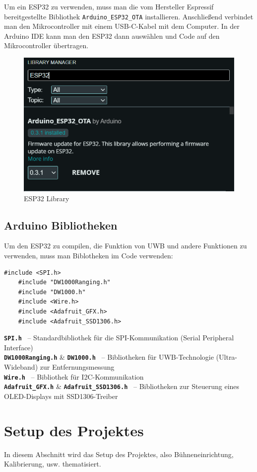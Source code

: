 Um ein ESP32 zu verwenden, muss man die vom Hersteller Espressif bereitgestellte Bibliothek \texttt{Arduino\_ESP32\_OTA} installieren. Anschließend verbindet man den Mikrocontroller mit einem USB-C-Kabel mit dem Computer. In der Arduino IDE kann man den ESP32 dann auswählen und Code auf den Mikrocontroller übertragen.

\begin{figure}[H]
	\centering
	\includegraphics[width=0.5\linewidth]{images/ArduinoLib.png}
	\caption[ESP32Library]{ESP32 Library}
	\label{fig:ESP32Lib}
\end{figure}

\subsection{Arduino Bibliotheken}
Um den ESP32 zu compilen, die Funktion von UWB und andere Funktionen zu verwenden, muss man Biblotheken im Code verwenden: 
\begin{lstlisting}[style=C++, caption=Biblotheken, captionpos=b]
	#include <SPI.h>
	#include "DW1000Ranging.h"
	#include "DW1000.h"
	#include <Wire.h>
	#include <Adafruit_GFX.h>
	#include <Adafruit_SSD1306.h>
\end{lstlisting}

\textbf{\texttt{SPI.h}} \ – Standardbibliothek für die SPI-Kommunikation (Serial Peripheral Interface) \\
\textbf{\texttt{DW1000Ranging.h}} \& \textbf{\texttt{DW1000.h}} \ – Bibliotheken für UWB-Technologie (Ultra-Wideband) zur Entfernungsmessung \\
\textbf{\texttt{Wire.h}} \ – Bibliothek für I2C-Kommunikation \\
\textbf{\texttt{Adafruit\_GFX.h}} \& \textbf{\texttt{Adafruit\_SSD1306.h}} \ – Bibliotheken zur Steuerung eines OLED-Displays mit SSD1306-Treiber



\section{Setup des Projektes}
In diesem Abschnitt wird das Setup des Projektes, also Bühneneinrichtung, Kalibrierung, usw. thematisiert.


